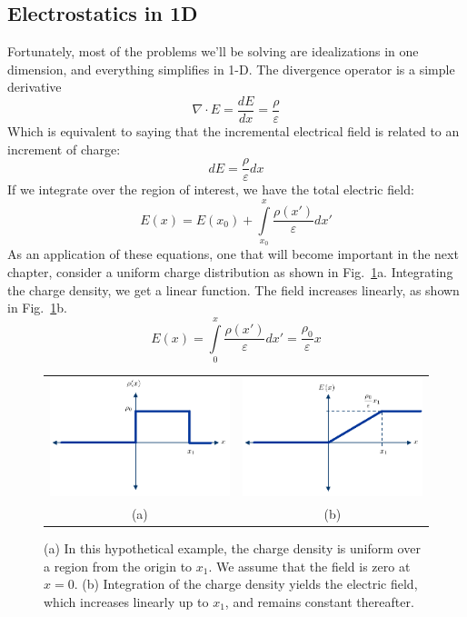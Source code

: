 \subsection{Electrostatics in 1D}
Fortunately, most of the problems we'll be solving are idealizations in one dimension, and everything simplifies in 1-D.  The divergence operator is a simple derivative
    \begin{equation} 
        \nabla  \cdot E = \frac{{dE}}{{dx}} = \frac{\rho }{\varepsilon } 
    \end{equation}
Which is equivalent to saying that the incremental electrical field is related to an increment of charge:
    \begin{equation} 
        dE = \frac{\rho }{\varepsilon }dx 
    \end{equation}
If we integrate over the region of interest, we have the total electric field:
    \begin{equation} 
        E(x) = E({x_0}) + \int\limits_{{x_0}}^x {\frac{{\rho (x')}}{\varepsilon }} dx'
    \end{equation}
As an application of these equations, one that will become important in the next chapter, consider a uniform charge distribution as shown in Fig.~\ref{fig:mod2-2_ICtech_sld_13}a.  Integrating the charge density, we get a linear function.  The field increases linearly, as shown in Fig.~\ref{fig:mod2-2_ICtech_sld_13}b.
    \begin{equation} 
        E(x) = \int\limits_0^x {\frac{{\rho (x')}}{\varepsilon}} dx' = \frac{{{\rho _0}}}{\varepsilon}x 
    \end{equation}
\begin{figure}[tb]
\centering
\begin{tabular}{cc}
\includegraphics[width=.4\columnwidth]{mod2-2_ICtech_sld_13} &
\includegraphics[width=.4\columnwidth]{mod2-2_ICtech_sld_13b}\\
(a) & (b)\\
\end{tabular}
\caption{(a) In this hypothetical example, the charge density is uniform over a region from the origin to $x_1$.  We assume that the field is zero at $x=0$.  (b) Integration of the charge density yields the electric field, which increases linearly up to $x_1$, and remains constant thereafter.} \label{fig:mod2-2_ICtech_sld_13}
\end{figure}
